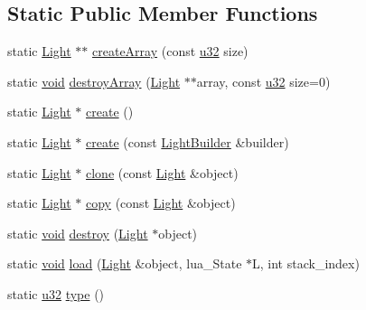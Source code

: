 \subsection*{Static Public Member Functions}
\begin{DoxyCompactItemize}
\item 
static \mbox{\hyperlink{classnjli_1_1_light}{Light}} $\ast$$\ast$ \mbox{\hyperlink{classnjli_1_1_light_af5480d5e20cc23e6b6396682933b8f7b}{create\+Array}} (const \mbox{\hyperlink{_util_8h_a10e94b422ef0c20dcdec20d31a1f5049}{u32}} size)
\item 
static \mbox{\hyperlink{_thread_8h_af1e856da2e658414cb2456cb6f7ebc66}{void}} \mbox{\hyperlink{classnjli_1_1_light_a414cc8fa485887315275bb0aff544317}{destroy\+Array}} (\mbox{\hyperlink{classnjli_1_1_light}{Light}} $\ast$$\ast$array, const \mbox{\hyperlink{_util_8h_a10e94b422ef0c20dcdec20d31a1f5049}{u32}} size=0)
\item 
static \mbox{\hyperlink{classnjli_1_1_light}{Light}} $\ast$ \mbox{\hyperlink{classnjli_1_1_light_a7cebda7210fd52bddcd127d856917567}{create}} ()
\item 
static \mbox{\hyperlink{classnjli_1_1_light}{Light}} $\ast$ \mbox{\hyperlink{classnjli_1_1_light_a9f63fa25bf0911636398d7b0d9d91a2f}{create}} (const \mbox{\hyperlink{classnjli_1_1_light_builder}{Light\+Builder}} \&builder)
\item 
static \mbox{\hyperlink{classnjli_1_1_light}{Light}} $\ast$ \mbox{\hyperlink{classnjli_1_1_light_a5117da30363b8e8474bf188a9b4afac7}{clone}} (const \mbox{\hyperlink{classnjli_1_1_light}{Light}} \&object)
\item 
static \mbox{\hyperlink{classnjli_1_1_light}{Light}} $\ast$ \mbox{\hyperlink{classnjli_1_1_light_a8396303da432e6fe4d24c92ef7b37d36}{copy}} (const \mbox{\hyperlink{classnjli_1_1_light}{Light}} \&object)
\item 
static \mbox{\hyperlink{_thread_8h_af1e856da2e658414cb2456cb6f7ebc66}{void}} \mbox{\hyperlink{classnjli_1_1_light_aedead9223dc5a89c173156b6d2aff99d}{destroy}} (\mbox{\hyperlink{classnjli_1_1_light}{Light}} $\ast$object)
\item 
static \mbox{\hyperlink{_thread_8h_af1e856da2e658414cb2456cb6f7ebc66}{void}} \mbox{\hyperlink{classnjli_1_1_light_af7ce8d0f0ae2c3ab98254f982c337886}{load}} (\mbox{\hyperlink{classnjli_1_1_light}{Light}} \&object, lua\+\_\+\+State $\ast$L, int stack\+\_\+index)
\item 
static \mbox{\hyperlink{_util_8h_a10e94b422ef0c20dcdec20d31a1f5049}{u32}} \mbox{\hyperlink{classnjli_1_1_light_aa33ddd3945fc8bf5510edb43b97cab08}{type}} ()
\end{DoxyCompactItemize}
